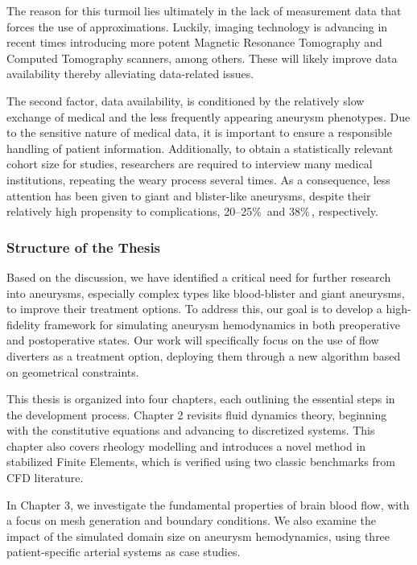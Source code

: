 The reason for this turmoil lies ultimately in the lack of measurement data that forces the use of approximations. Luckily, imaging technology is advancing in recent times introducing more potent Magnetic Resonance Tomography and Computed Tomography scanners, among others. These will likely improve data availability thereby alleviating data-related issues.

The second factor, data availability, is conditioned by the relatively slow exchange of medical and the less frequently appearing aneurysm phenotypes. Due to the sensitive nature of medical data, it is important to ensure a responsible handling of patient information. Additionally, to obtain a statistically relevant cohort size for studies, researchers are required to interview many medical institutions, repeating the weary process several times. As a consequence, less attention has been given to giant and blister-like aneurysms, despite their relatively high propensity to complications, 20--25\%\,\cite{Parkinson2006, Gruber1999} and 38\%\,\cite{Peschillo2016}, respectively.

\subsubsection*{Structure of the Thesis}
Based on the discussion, we have identified a critical need for further research into aneurysms, especially complex types like blood-blister and giant aneurysms, to improve their treatment options. To address this, our goal is to develop a high-fidelity framework for simulating aneurysm hemodynamics in both preoperative and postoperative states. Our work will specifically focus on the use of flow diverters as a treatment option, deploying them through a new algorithm based on geometrical constraints.

This thesis is organized into four chapters, each outlining the essential steps in the development process. Chapter 2 revisits fluid dynamics theory, beginning with the constitutive equations and advancing to discretized systems. This chapter also covers rheology modelling and introduces a novel method in stabilized Finite Elements, which is verified using two classic benchmarks from CFD literature.

In Chapter 3, we investigate the fundamental properties of brain blood flow, with a focus on mesh generation and boundary conditions. We also examine the impact of the simulated domain size on aneurysm hemodynamics, using three patient-specific arterial systems as case studies.

